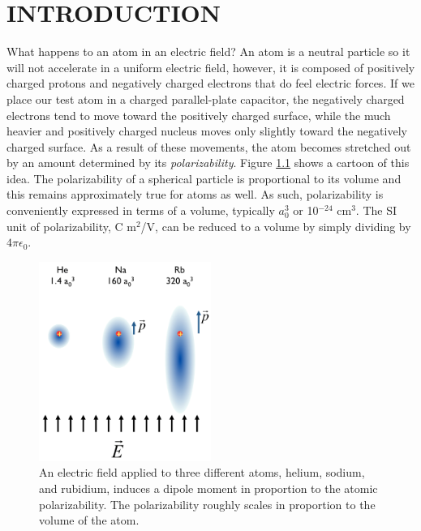 \chapter{INTRODUCTION}


What happens to an atom in an electric field? An atom is a neutral particle so it will not accelerate in a uniform electric field, however, it is composed of positively charged protons and negatively charged electrons that do feel electric forces. If we place our test atom in a charged parallel-plate capacitor, the negatively charged electrons tend to move toward the positively charged surface, while the much heavier and positively charged nucleus moves only slightly toward the negatively charged surface. As a result of these movements, the atom becomes stretched out by an amount determined by its \emph{polarizability}. Figure \ref{simplePolFig} shows a cartoon of this idea. The polarizability of a spherical particle is proportional to its volume and this remains approximately true for atoms as well. As such, polarizability is conveniently expressed in terms of a volume, typically $a_0^3$ or 10$^{-24}$ cm$^3$. The SI unit of polarizability, C m$^2$/V, can be reduced to a volume by simply dividing by $4\pi\epsilon_0$. 


\begin{figure}
\centerline{\includegraphics[width=0.5\textwidth]{Figures/simplePolFigv2.png}}
\caption[An electric field applied to an atom induces a dipole moment in proportion to its atomic polarizability.]{\label{simplePolFig}An electric field applied to three different atoms, helium, sodium, and rubidium, induces a dipole moment in proportion to the atomic polarizability. The polarizability roughly scales in proportion to the volume of the atom.}
\end{figure}


